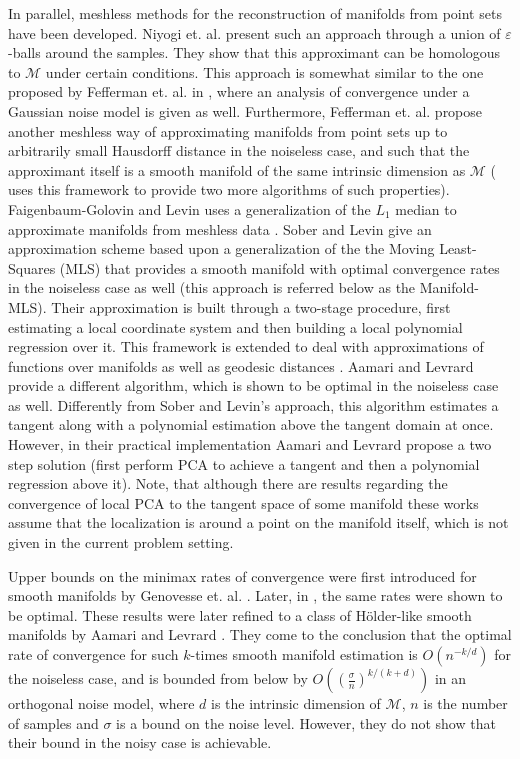 \documentclass[12pt]{article}
\theoremstyle{remark}
\newcommand{\MM}{\mathcal{M}}
\begin{document}
In parallel, meshless methods for the reconstruction of manifolds from point sets have been developed.
Niyogi et. al. \cite{niyogi2008finding} present such an approach through a union of $\varepsilon$-balls around the samples.
They show that this approximant can be homologous to $\MM$ under certain conditions. 
This approach is somewhat similar to the one proposed by Fefferman et. al. in \cite{fefferman2018fitting}, where an analysis of convergence under a Gaussian noise model is given as well. 
Furthermore, Fefferman et. al. \cite{fefferman2019fitting} %
propose another meshless way of approximating manifolds from point sets up to arbitrarily small Hausdorff distance in the noiseless case, and such that the approximant itself is a smooth manifold of the same intrinsic dimension as $\MM$ (\cite{mohammed2017manifold} uses this framework to provide two more algorithms of such properties).
Faigenbaum-Golovin and Levin uses a generalization of the $L_1$ median to approximate manifolds from meshless data \cite{faigenbaum2020manifold}.
Sober and Levin \cite{sober2016MMLS} give an approximation scheme based upon a generalization of the the Moving Least-Squares (MLS) \cite{levin2004mesh,mclain1976two} that provides a smooth manifold with optimal convergence rates in the noiseless case as well (this approach is referred below as the Manifold-MLS).
Their approximation is built through a two-stage procedure, first estimating a local coordinate system and then building a local polynomial regression over it. 
This framework is extended to deal with approximations of functions over manifolds \cite{sober2017approximation} as well as geodesic distances \cite{sober2020Geodesics}.
Aamari and Levrard \cite{aamari2019nonasymptotic} provide a different algorithm, which is shown to be optimal in the noiseless case as well. 
Differently from Sober and Levin's approach, this algorithm estimates a tangent along with a polynomial estimation above the tangent domain at once.
However, in their practical implementation Aamari and Levrard propose a two step solution (first perform PCA to achieve a tangent and then a polynomial regression above it). Note, that although there are results regarding the convergence of local PCA to the tangent space of some manifold these works assume that the localization is around a point on the manifold itself, which is not given in the current problem setting.


Upper bounds on the minimax rates of convergence were first introduced for smooth manifolds by Genovesse et. al. \cite{genovese2012minimax,genovese2012manifold}. Later, in \cite{kim2015tight}, the same rates were shown to be optimal.
These results were later refined to a class of H\"older-like smooth manifolds by Aamari and Levrard \cite{aamari2019nonasymptotic}.
They come to the conclusion that the optimal rate of convergence for such $k$-times smooth manifold estimation is $O(n^{-k/d})$ for the noiseless case, and is bounded from below by $O((\frac{\sigma}{n})^{k/(k+d)})$ in an orthogonal noise model, where $d$ is the intrinsic dimension of $\MM$, $n$ is the number of samples and $\sigma$ is a bound on the noise level.
However, they do not show that their bound in the noisy case is achievable. 
\end{document}
